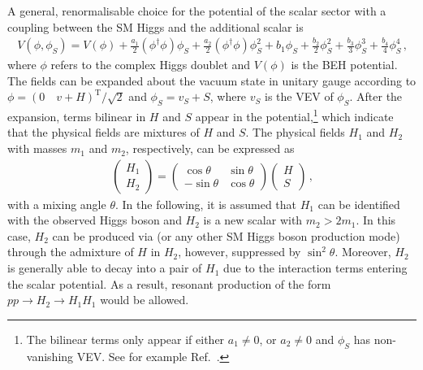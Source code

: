 \begin{description}
  A general, renormalisable choice for the potential of the scalar sector with a
  coupling between the SM Higgs and the additional scalar
  is~\cite{OConnell:2006rsp,No:2013wsa,Chen:2014ask,DiMicco:2019ngk}
  \begin{align*}
    V(\phi, \phi_{S}) = V(\phi)
    + \frac{a_1}{2} (\phi^\dagger \phi) \phi_{S}
    + \frac{a_2}{2} (\phi^\dagger \phi) \phi_{S}^2
    + b_1 \phi_{S} + \frac{b_2}{2} \phi_{S}^2 + \frac{b_3}{3} \phi_{S}^3 + \frac{b_4}{4} \phi_{S}^4 \,\text{,}
  \end{align*}
  where $\phi$ refers to the complex Higgs doublet and $V(\phi)$ is the BEH
  potential. The fields can be expanded about the vacuum state in unitary gauge
  according to $\phi = (0 \quad v + H)^{\text{T}} / \sqrt{2}$ and
  $\phi_{S} = v_{S} + S$, where $v_{S}$ is the VEV of $\phi_{S}$. After the
  expansion, terms bilinear in $H$ and $S$ appear in the potential,\footnote{The
    bilinear terms only appear if either $a_1 \neq 0$, or $a_2 \neq 0$ and
    $\phi_{S}$ has non-vanishing VEV. See for example Ref.~\cite{Chen:2014ask}.}
  which indicate that the physical fields are mixtures of $H$ and $S$. The
  physical fields $H_1$ and $H_2$ with masses $m_1$ and $m_2$, respectively, can
  be expressed as
  \begin{align*}
    \begin{pmatrix}
      H_1 \\
      H_2
    \end{pmatrix}
    =
    \begin{pmatrix}
      \cos\theta & \sin\theta \\
      -\sin\theta & \cos\theta
    \end{pmatrix}
    \begin{pmatrix}
      H \\
      S
    \end{pmatrix} \,\text{,}
  \end{align*}
  with a mixing angle $\theta$. In the following, it is assumed that $H_1$ can
  be identified with the observed Higgs boson and $H_2$ is a new scalar with
  $m_2 > 2 m_1$. In this case, $H_2$ can be produced via \ggF (or any other SM
  Higgs boson production mode) through the admixture of $H$ in $H_2$, however,
  suppressed by $\sin^2\theta$. Moreover, $H_2$ is generally able to decay into
  a pair of $H_1$ due to the interaction terms entering the scalar potential. As
  a result, resonant production of the form $pp \to H_2 \to H_1 H_1$ would be
  allowed.



\end{description}
